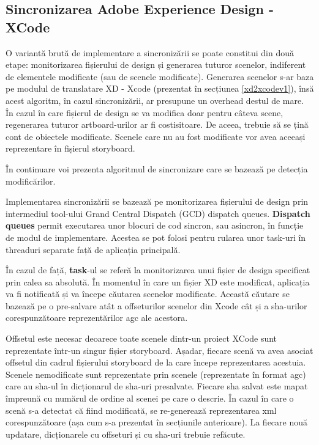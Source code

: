\subsection{Sincronizarea Adobe Experience Design - XCode}

O variantă brută de implementare a sincronizării se poate constitui din două etape: monitorizarea fișierului de design și generarea tuturor scenelor, indiferent de elementele modificate (sau de scenele modificate). Generarea scenelor s-ar baza pe modulul de translatare XD - Xcode (prezentat în secțiunea \ref{xd2xcodev1}), însă acest algoritm, în cazul sincronizării, ar presupune un overhead destul de mare. În cazul în care fișierul de design se va modifica doar pentru câteva scene, regenerarea tuturor artboard-urilor ar fi costisitoare. De aceea, trebuie să se țină cont de obiectele modificate. Scenele care nu au fost modificate vor avea aceeași reprezentare în fișierul storyboard.

În continuare voi prezenta algoritmul de sincronizare care se bazează pe detecția modificărilor.

Implementarea sincronizării se bazează pe monitorizarea fișierului de design prin intermediul tool-ului Grand Central Dispatch (GCD) dispatch queues. \textbf{Dispatch queues} permit executarea unor blocuri de cod sincron, sau asincron, în funcție de modul de implementare. Acestea se pot folosi pentru rularea unor task-uri în threaduri separate față de aplicația principală. 

În cazul de față, \textbf{task}-ul se referă la monitorizarea unui fișier de design specificat prin calea sa absolută. În momentul în care un fișier XD este modificat, aplicația va fi notificată și va începe căutarea scenelor modificate. 
Această căutare se bazează pe o pre-salvare atât a offseturilor scenelor din Xcode cât și a sha-urilor corespunzătoare reprezentărilor agc ale acestora. 

Offsetul este necesar deoarece toate scenele dintr-un proiect XCode sunt reprezentate într-un singur fișier storyboard. Așadar, fiecare scenă va avea asociat offsetul din cadrul fișierului storyboard de la care începe reprezentarea acestuia. 
Scenele nemodificate sunt reprezentate prin scenele (reprezentate în format agc) care au sha-ul în dicționarul de sha-uri presalvate. Fiecare sha salvat este mapat împreună cu numărul de ordine al scenei pe care o descrie. 
În cazul în care o scenă s-a detectat că fiind modificată, se re-generează reprezentarea xml corespunzătoare (așa cum s-a prezentat în secțiunile anterioare).  La fiecare nouă updatare, dicționarele cu offseturi și cu sha-uri trebuie refăcute.

